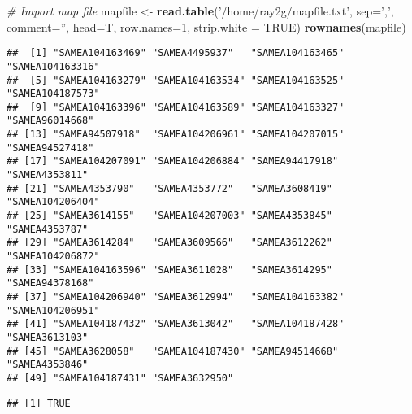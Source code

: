 \documentclass[]{article}
\newenvironment{Shaded}{\begin{snugshade}}{\end{snugshade}}
\newcommand{\CommentTok}[1]{\textcolor[rgb]{0.56,0.35,0.01}{\textit{#1}}}
\newcommand{\DataTypeTok}[1]{\textcolor[rgb]{0.13,0.29,0.53}{#1}}
\newcommand{\DecValTok}[1]{\textcolor[rgb]{0.00,0.00,0.81}{#1}}
\newcommand{\KeywordTok}[1]{\textcolor[rgb]{0.13,0.29,0.53}{\textbf{#1}}}
\newcommand{\NormalTok}[1]{#1}
\newcommand{\OperatorTok}[1]{\textcolor[rgb]{0.81,0.36,0.00}{\textbf{#1}}}
\newcommand{\OtherTok}[1]{\textcolor[rgb]{0.56,0.35,0.01}{#1}}
\newcommand{\StringTok}[1]{\textcolor[rgb]{0.31,0.60,0.02}{#1}}
\begin{document}
\begin{Shaded}
\begin{Highlighting}[]
\CommentTok{# Import map file }
\NormalTok{mapfile <-}\StringTok{ }\KeywordTok{read.table}\NormalTok{(}\StringTok{'/home/ray2g/mapfile.txt'}\NormalTok{, }\DataTypeTok{sep=}\StringTok{','}\NormalTok{, }\DataTypeTok{comment=}\StringTok{''}\NormalTok{, }\DataTypeTok{head=}\NormalTok{T, }\DataTypeTok{row.names=}\DecValTok{1}\NormalTok{, }\DataTypeTok{strip.white =} \OtherTok{TRUE}\NormalTok{)}
\KeywordTok{rownames}\NormalTok{(mapfile)}
\end{Highlighting}
\end{Shaded}

\begin{verbatim}
##  [1] "SAMEA104163469" "SAMEA4495937"   "SAMEA104163465" "SAMEA104163316"
##  [5] "SAMEA104163279" "SAMEA104163534" "SAMEA104163525" "SAMEA104187573"
##  [9] "SAMEA104163396" "SAMEA104163589" "SAMEA104163327" "SAMEA96014668" 
## [13] "SAMEA94507918"  "SAMEA104206961" "SAMEA104207015" "SAMEA94527418" 
## [17] "SAMEA104207091" "SAMEA104206884" "SAMEA94417918"  "SAMEA4353811"  
## [21] "SAMEA4353790"   "SAMEA4353772"   "SAMEA3608419"   "SAMEA104206404"
## [25] "SAMEA3614155"   "SAMEA104207003" "SAMEA4353845"   "SAMEA4353787"  
## [29] "SAMEA3614284"   "SAMEA3609566"   "SAMEA3612262"   "SAMEA104206872"
## [33] "SAMEA104163596" "SAMEA3611028"   "SAMEA3614295"   "SAMEA94378168" 
## [37] "SAMEA104206940" "SAMEA3612994"   "SAMEA104163382" "SAMEA104206951"
## [41] "SAMEA104187432" "SAMEA3613042"   "SAMEA104187428" "SAMEA3613103"  
## [45] "SAMEA3628058"   "SAMEA104187430" "SAMEA94514668"  "SAMEA4353846"  
## [49] "SAMEA104187431" "SAMEA3632950"
\end{verbatim}

\begin{Shaded}
\end{Shaded}

\begin{verbatim}
## [1] TRUE
\end{verbatim}
\end{document}
